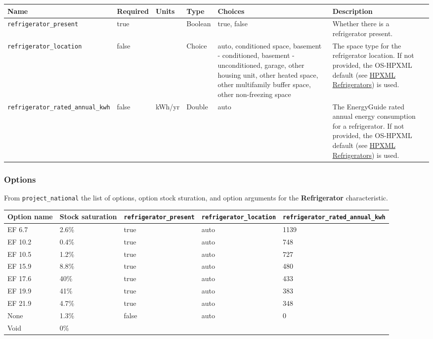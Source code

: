 \begin{longtable}[]{@{}llllll@{}}
\toprule\noalign{}
Name & Required & Units & Type & Choices & Description \\
\midrule\noalign{}
\endhead
\bottomrule\noalign{}
\endlastfoot
\texttt{refrigerator\_present} & true & & Boolean & true, false &
Whether there is a refrigerator present. \\
\texttt{refrigerator\_location} & false & & Choice & auto, conditioned
space, basement - conditioned, basement - unconditioned, garage, other
housing unit, other heated space, other multifamily buffer space, other
non-freezing space & The space type for the refrigerator location. If
not provided, the OS-HPXML default (see
\href{https://openstudio-hpxml.readthedocs.io/en/v1.7.0/workflow_inputs.html\#hpxml-refrigerators}{HPXML
Refrigerators}) is used. \\
\texttt{refrigerator\_rated\_annual\_kwh} & false & kWh/yr & Double &
auto & The EnergyGuide rated annual energy consumption for a
refrigerator. If not provided, the OS-HPXML default (see
\href{https://openstudio-hpxml.readthedocs.io/en/v1.7.0/workflow_inputs.html\#hpxml-refrigerators}{HPXML
Refrigerators}) is used. \\
\end{longtable}

\subsubsection{Options}\label{options-138}

From \texttt{project\_national} the list of options, option stock
sturation, and option arguments for the \textbf{Refrigerator}
characteristic.

\begin{longtable}[]{@{}lllll@{}}
\toprule\noalign{}
Option name & Stock saturation & \texttt{refrigerator\_present} &
\texttt{refrigerator\_location} &
\texttt{refrigerator\_rated\_annual\_kwh} \\
\midrule\noalign{}
\endhead
\bottomrule\noalign{}
\endlastfoot
EF 6.7 & 2.6\% & true & auto & 1139 \\
EF 10.2 & 0.4\% & true & auto & 748 \\
EF 10.5 & 1.2\% & true & auto & 727 \\
EF 15.9 & 8.8\% & true & auto & 480 \\
EF 17.6 & 40\% & true & auto & 433 \\
EF 19.9 & 41\% & true & auto & 383 \\
EF 21.9 & 4.7\% & true & auto & 348 \\
None & 1.3\% & false & auto & 0 \\
Void & 0\% & & & \\
\end{longtable}

